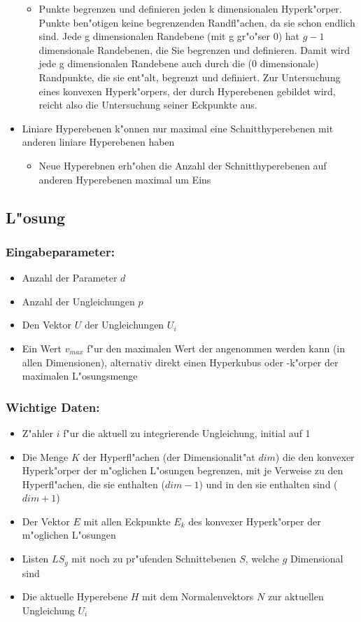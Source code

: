 \begin{itemize}
\begin{itemize}
  \item Punkte begrenzen und definieren jeden k dimensionalen Hyperk"orper. Punkte ben"otigen keine begrenzenden Randfl"achen, da sie schon endlich sind. Jede g dimensionalen Randebene (mit g gr"o"ser 0) hat $g-1$ dimensionale Randebenen, die Sie begrenzen und definieren. Damit wird jede g dimensionalen Randebene auch durch die (0 dimensionale) Randpunkte, die sie ent"alt, begrenzt und definiert. Zur Untersuchung eines konvexen Hyperk"orpers, der durch Hyperebenen gebildet wird, reicht also die Untersuchung seiner Eckpunkte aus.
 \end{itemize}
 \item Liniare Hyperebenen k"onnen nur maximal eine Schnitthyperebenen mit anderen liniare Hyperebenen haben
 \begin{itemize}
  \item Neue Hyperebnen erh"ohen die Anzahl der Schnitthyperebenen auf anderen Hyperebenen maximal um Eins
 \end{itemize}
\end{itemize}


\subsection{L"osung}

\subsubsection{Eingabeparameter:}
\begin{itemize}
 \item Anzahl der Parameter $d$
 \item Anzahl der Ungleichungen $p$
 \item Den Vektor $U$ der Ungleichungen $U_i$
 \item Ein Wert $v_{max}$ f"ur den maximalen Wert der angenommen werden kann (in allen Dimensionen), alternativ direkt einen Hyperkubus oder -k"orper der maximalen L"osungsmenge
\end{itemize}

\subsubsection{Wichtige Daten:}
\begin{itemize}
 \item Z"ahler $i$ f"ur die aktuell zu integrierende Ungleichung, initial auf 1
 \item Die Menge $K$ der Hyperfl"achen (der Dimensionalit"at $dim$) die den konvexer Hyperk"orper der m"oglichen L"osungen begrenzen, mit je Verweise zu den Hyperfl"achen, die sie enthalten ($dim-1$) und in den sie enthalten sind ($dim+1$)
 \item Der Vektor $E$ mit allen Eckpunkte $E_k$ des konvexer Hyperk"orper der m"oglichen L"osungen
 \item Listen $LS_g$ mit noch zu pr"ufenden Schnittebenen $S$, welche $g$ Dimensional sind
 \item Die aktuelle Hyperebene $H$ mit dem Normalenvektors $N$ zur aktuellen Ungleichung $U_i$
\end{itemize}

